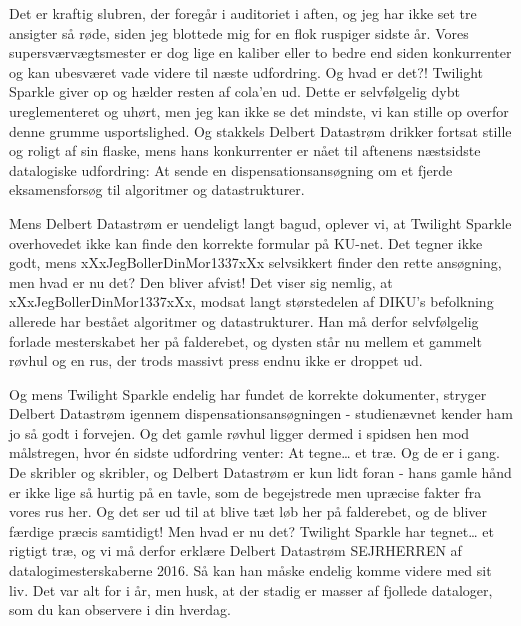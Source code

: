 \documentclass[a4paper,11pt]{article}
\begin{document}
\begin{sketch}


 Det er kraftig slubren, der foregår i auditoriet i aften, og jeg har ikke set tre ansigter så røde, siden jeg blottede mig for en flok ruspiger sidste år. Vores supersværvægtsmester er dog lige en kaliber eller to bedre end siden konkurrenter og kan ubesværet vade videre til næste udfordring. Og hvad er det?! Twilight Sparkle giver op og hælder resten af cola’en ud. Dette er selvfølgelig dybt ureglementeret og uhørt, men jeg kan ikke se det mindste, vi kan stille op overfor denne grumme usportslighed. Og stakkels Delbert Datastrøm drikker fortsat stille og roligt af sin flaske, mens hans konkurrenter er nået til aftenens næstsidste datalogiske udfordring: At sende en dispensationsansøgning om et fjerde eksamensforsøg til algoritmer og datastrukturer.




 Mens Delbert Datastrøm er uendeligt langt bagud, oplever vi, at Twilight Sparkle overhovedet ikke kan finde den korrekte formular på KU-net. Det tegner ikke godt, mens xXxJegBollerDinMor1337xXx selvsikkert finder den rette ansøgning, men hvad er nu det? Den bliver afvist! Det viser sig nemlig, at xXxJegBollerDinMor1337xXx, modsat langt størstedelen af DIKU’s befolkning allerede har bestået algoritmer og datastrukturer. Han må derfor selvfølgelig forlade mesterskabet her på falderebet, og dysten står nu mellem et gammelt røvhul og en rus, der trods massivt press endnu ikke er droppet ud.




 Og mens Twilight Sparkle endelig har fundet de korrekte dokumenter, stryger Delbert Datastrøm igennem dispensationsansøgningen - studienævnet kender ham jo så godt i forvejen. Og det gamle røvhul ligger dermed i spidsen hen mod målstregen, hvor én sidste udfordring venter: At tegne… et træ. Og de er i gang. De skribler og skribler, og Delbert Datastrøm er kun lidt foran - hans gamle hånd er ikke lige så hurtig på en tavle, som de begejstrede men upræcise fakter fra vores rus her. Og det ser ud til at blive tæt løb her på falderebet, og de bliver færdige præcis samtidigt! Men hvad er nu det? Twilight Sparkle har tegnet… et rigtigt træ, og vi må derfor erklære Delbert Datastrøm SEJRHERREN af datalogimesterskaberne 2016. Så kan han måske endelig komme videre med sit liv. Det var alt for i år, men husk,  at der stadig er masser af fjollede dataloger, som du kan observere i din hverdag.




\end{sketch}
\end{document}
